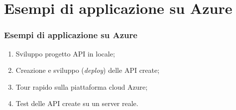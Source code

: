 \documentclass{beamer}
\begin{document}
	\section{Esempi di applicazione su Azure}
	\begin{frame}
		\frametitle{Esempi di applicazione su Azure}
		\begin{enumerate}
			\item Sviluppo progetto API in locale;
			
			\item Creazione e sviluppo (\emph{deploy}) delle API create;
			
			\item Tour rapido sulla piattaforma cloud Azure;
			
			\item Test delle API create su un server reale.
		\end{enumerate}
	\end{frame}
	
\end{document}
